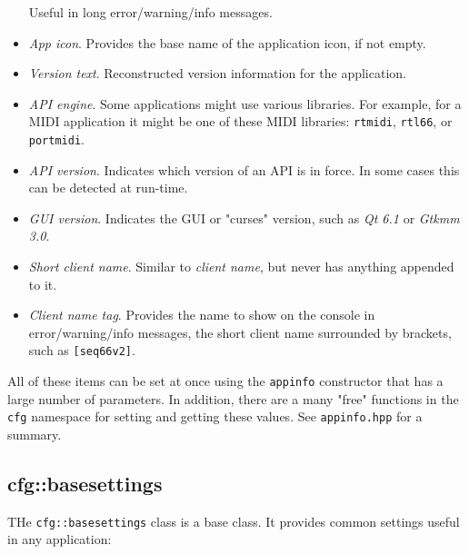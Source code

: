 \begin{itemize}
         Useful in long error/warning/info messages.
      \item \textsl{App icon}.
         Provides the base name of the application icon, if not empty.
      \item \textsl{Version text}.
         Reconstructed version information for the application.
      \item \textsl{API engine}.
         Some applications might use various libraries.
         For example, for a MIDI application it might be one of these
         MIDI libraries:
         \texttt{rtmidi},
         \texttt{rtl66},
         or \texttt{portmidi}.
      \item \textsl{API version}.
         Indicates which version of an API is in force.
         In some cases this can be detected at run-time.
      \item \textsl{GUI version}.
         Indicates the GUI or "curses" version, such as \textsl{Qt 6.1}
         or \textsl{Gtkmm 3.0}.
      \item \textsl{Short client name}.
         Similar to \textsl{client name}, but never has anything appended
         to it.
      \item \textsl{Client name tag}.
         Provides the name to show on the console in error/warning/info messages,
         the short client name surrounded by brackets, such as
         \texttt{[seq66v2]}.
   \end{itemize}

   All of these items can be set at once using the \texttt{appinfo}
   constructor that has a large number of parameters.
   In addition, there are a many "free" functions in the \texttt{cfg}
   namespace for setting and getting these values.
   See \texttt{appinfo.hpp} for a summary.

\subsection{cfg::basesettings}
\label{subsec:cfg_namespace_basesettings}

   THe \texttt{cfg::basesettings} class is a base class.
   It provides common settings useful in any application:


